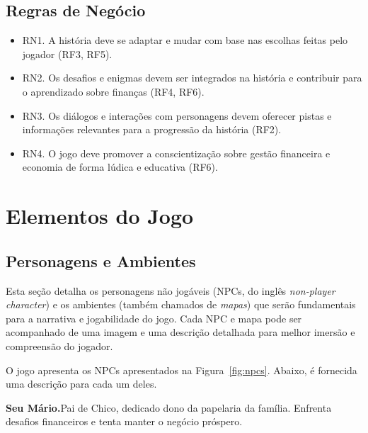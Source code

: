\subsection*{Regras de Negócio}
\begin{itemize}
	\item RN1. A história deve se adaptar e mudar com base nas escolhas feitas pelo jogador (RF3, RF5).
	\item RN2. Os desafios e enigmas devem ser integrados na história e contribuir para o aprendizado sobre finanças (RF4, RF6).
	\item RN3. Os diálogos e interações com personagens devem oferecer pistas e informações relevantes para a progressão da história (RF2).
	\item RN4. O jogo deve promover a conscientização sobre gestão financeira e economia de forma lúdica e educativa (RF6).
\end{itemize}

\section{Elementos do Jogo}

\subsection{Personagens e Ambientes}
Esta seção detalha os personagens não jogáveis (NPCs, do inglês \textit{non-player character}) e os ambientes (também chamados de \textit{mapas}) que serão fundamentais para a narrativa e jogabilidade do jogo. Cada NPC e mapa pode ser acompanhado de uma imagem e uma descrição detalhada para melhor imersão e compreensão do jogador.


O jogo apresenta os NPCs apresentados na Figura~\ref{fig:npcs}. Abaixo, é fornecida uma descrição para cada um deles.


\medskip\noindent \textbf{Seu Mário.}\quad Pai de Chico, dedicado dono da papelaria da família. Enfrenta desafios financeiros e tenta manter o negócio próspero.

